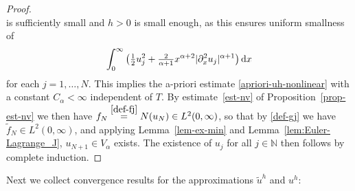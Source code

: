 \documentclass[reqno,12pt]{amsart}
\renewcommand{\d}{\ensuremath{\mathrm{d}}}
\newcommand{\N}{\ensuremath{\mathbb{N}}}
\renewcommand{\d}{\ensuremath{{\rm d}}}
\numberwithin{equation}{section}
\begin{document}
\begin{proof}
\[\]
%
is sufficiently small and $h > 0$ is small enough, as this ensures uniform smallness of
%
\[
\int_0^\infty \big(\tfrac 1 2 u_j^2 + \tfrac{2}{\alpha+1} x^{\alpha+2} |\partial_x^2 u_j|^{\alpha+1}\big) \, \d x
\]
%
for each $j = 1,\ldots,N$. This implies the a-priori estimate \eqref{apriori-uh-nonlinear} with a constant $C_\alpha < \infty$ independent of $T$. By estimate~\eqref{est-nv} of Proposition~\ref{prop-est-nv} we then have $f_N \stackrel{\eqref{def-fj}}{=} N(u_N) \in L^2(0,\infty)$, so that by \eqref{def-gj} we have $\tilde f_N \in L^2(0,\infty)$, and applying Lemma~\ref{lem-ex-min} and Lemma~\ref{lem:Euler-Lagrange_J}, $u_{N+1} \in V_\alpha$ exists. The existence of $u_j$ for all $j \in \N$ then follows by complete induction.
\end{proof}
%

Next we collect convergence results for the approximations $\tilde u^h$ and $u^h$:
%
\end{document}
